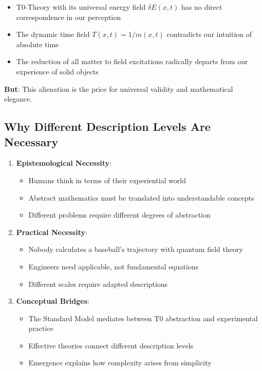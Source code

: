 \documentclass[12pt,a4paper]{article}
\begin{document}
	\begin{itemize}
		\item T0-Theory with its universal energy field $\delta E(x,t)$ has no direct correspondence in our perception
		\item The dynamic time field $T(x,t) = 1/m(x,t)$ contradicts our intuition of absolute time
		\item The reduction of all matter to field excitations radically departs from our experience of solid objects
	\end{itemize}
	
	\textbf{But}: This alienation is the price for universal validity and mathematical elegance.
	
	\subsection{Why Different Description Levels Are Necessary}
	
	\begin{enumerate}
		\item \textbf{Epistemological Necessity}:
		\begin{itemize}
			\item Humans think in terms of their experiential world
			\item Abstract mathematics must be translated into understandable concepts
			\item Different problems require different degrees of abstraction
		\end{itemize}
		
		\item \textbf{Practical Necessity}:
		\begin{itemize}
			\item Nobody calculates a baseball's trajectory with quantum field theory
			\item Engineers need applicable, not fundamental equations
			\item Different scales require adapted descriptions
		\end{itemize}
		
		\item \textbf{Conceptual Bridges}:
		\begin{itemize}
			\item The Standard Model mediates between T0 abstraction and experimental practice
			\item Effective theories connect different description levels
			\item Emergence explains how complexity arises from simplicity
		\end{itemize}
	\end{enumerate}
	
\end{document}
